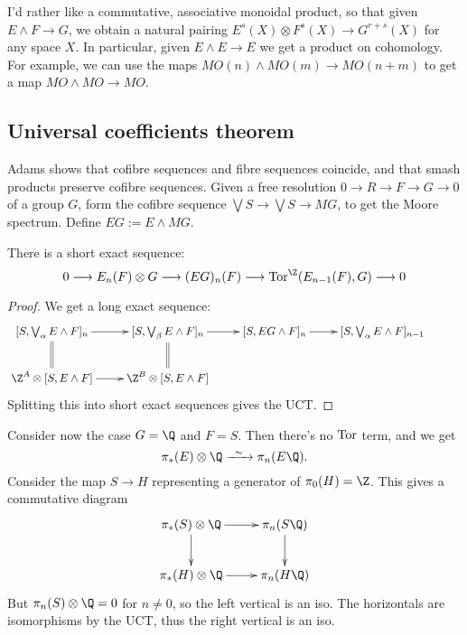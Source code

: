 \documentclass[11pt]{article}
\begin{document}
\begin{KrishanuAdamsStableHtpy}
I'd rather like a commutative, associative monoidal product, so that given $E\wedge F\to G$, we obtain a natural pairing $E^s(X)\otimes F^s(X)\to G^{r+s}(X)$ for any space $X$. In particular, given $E\wedge E\to E$ we get a product on cohomology. For example, we can use the maps $MO(n)\wedge MO(m)\to MO(n+m)$ to get a map $MO\wedge MO\to MO$.
\subsection*{Universal coefficients theorem}
Adams shows that cofibre sequences and fibre sequences coincide, and that smash products preserve cofibre sequences.
Given a free resolution $0\to R\to F\to G\to0$ of a group $G$, form the cofibre sequence $\bigvee S\to\bigvee S\to MG$, to get the Moore spectrum. Define $EG:=E\wedge MG$. 
\begin{thm*}
There is a short exact sequence:
\[0\to E_n(F)\otimes G\to(EG)_n(F)\to\Tor^\Z(E_{n-1}(F),G)\to0\]
\end{thm*}
\begin{proof}
We get a long exact sequence:
\[\xymatrix{
[S,\bigvee_\alpha E\wedge F]_n\ar[r]\ar@{=}[d]&[S,\bigvee_\beta E\wedge F]_n\ar[r]&[S, EG\wedge F]_n\ar[r]&[S,\bigvee_\alpha E\wedge F]_{n-1}&\\%
\Z^A\otimes[S,E\wedge F]\ar[r]&\Z^B\otimes[S,E\wedge F]\ar@{=}[u]
}\]
Splitting this into short exact sequences gives the UCT.
\end{proof}
Consider now the case $G=\Q$ and $F=S$. Then there's no $\operatorname{Tor}$ term, and we get
\[\pi_*(E)\otimes\Q\weakequiv\pi_n(E\Q).\]
Consider the map $S\to H$ representing a generator of $\pi_0(H)=\Z$. This gives a commutative diagram
\[\xymatrix{
\ar[d]\pi_*(S)\otimes\Q\ar[r]&\pi_n(S\Q)\ar[d]\\
\pi_*(H)\otimes\Q\ar[r]&\pi_n(H\Q)
}\]
But $\pi_n(S)\otimes\Q=0$ for $n\neq0$, so the left vertical is an iso. The horizontals are isomorphisms by the UCT, thus the right vertical is an iso.

\noindent[Haynes: can always write $E=\colim \Sigma^{-n}E_n$...

There are maps of spectra which induce zero on every homology theory. Call these `phantoms'. This doesn't happen for cohomology theories.]

\pagebreak
\end{KrishanuAdamsStableHtpy}
\end{document}

